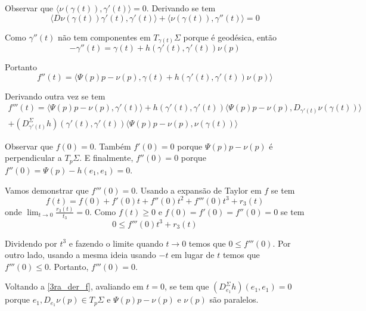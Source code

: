Observar que $ \langle \nu(\gamma(t)), \gamma'(t) \rangle = 0 $. Derivando se tem
\begin{equation*}
	\langle D \nu(\gamma(t)) \gamma'(t), \gamma'(t) \rangle + \langle \nu(\gamma(t)), \gamma''(t) \rangle = 0
\end{equation*}

Como $\gamma''(t)$ não tem componentes em $T_{\gamma(t)} \Sigma$ porque é geodésica, então
\begin{equation*}
	-\gamma''(t) = \gamma(t) + h(\gamma'(t), \gamma'(t)) \nu(p)
\end{equation*}

Portanto
\begin{equation*}
	f''(t) = \langle \Psi(p) p - \nu(p), \gamma(t) + h(\gamma'(t), \gamma'(t)) \nu(p) \rangle
\end{equation*}

Derivando outra vez se tem
\begin{multline}\label{3ra_der_f}
	f'''(t) = \langle \Psi(p)p - \nu(p), \gamma'(t) \rangle + h(\gamma'(t), \gamma'(t)) \langle \Psi(p)p - \nu(p), D_{\gamma'(t)} \nu(\gamma(t)) \rangle\\
	+ \left( D_{\gamma'(t)}^{\Sigma} h \right) (\gamma'(t), \gamma'(t)) \langle \Psi(p)p - \nu(p), \nu(\gamma(t)) \rangle
\end{multline}

Observar que $f(0)=0$. Também $f'(0)=0$ porque $\Psi(p)p - \nu(p)$ é perpendicular a $T_p \Sigma$. E finalmente, $f''(0)=0$ porque $f''(0) = \Psi(p) - h(e_1,e_1)=0$.

Vamos demonstrar que $f'''(0)=0$. Usando a expansão de Taylor em $f$ se tem
\begin{equation*}
	f(t) = f(0) + f'(0)t + f''(0)t^2 + f'''(0)t^3 + r_3(t)
\end{equation*}  
onde $\lim_{t \rightarrow 0} \frac{r_3(t)}{t_3}=0$. Como $f(t) \geq 0$ e $f(0)=f'(0)=f''(0)=0$ se tem
\begin{equation*}
	0 \leq f'''(0) t^3 + r_3(t)
\end{equation*}

Dividendo por $t^3$ e fazendo o limite quando $t \rightarrow 0$ temos que $0 \leq f'''(0)$. Por outro lado, usando a mesma ideia usando $-t$ em lugar de  $t$ temos que $f'''(0) \leq 0$. Portanto, $f'''(0)=0$.

Voltando  a \ref{3ra_der_f}, avaliando em $t=0$, se tem que $(D_{e_1}^{\Sigma} h) (e_1,e_1) = 0$ porque $e_1, D_{e_1} \nu(p) \in T_p \Sigma$ e $\Psi(p)p - \nu(p)$ e $\nu(p)$ são paralelos.


